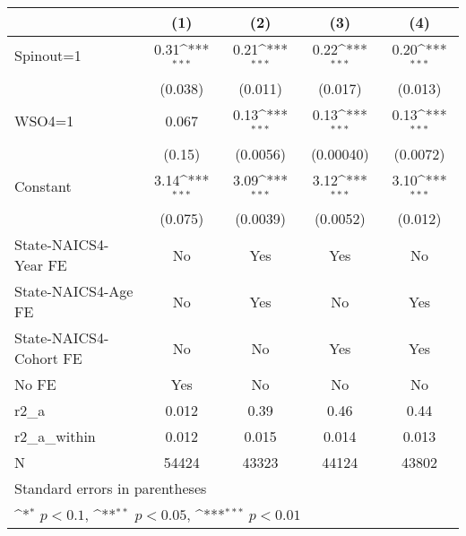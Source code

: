 {
\def\sym#1{\ifmmode^{#1}\else\(^{#1}\)\fi}
\begin{tabular}{l*{4}{c}}
\hline\hline
                    &\multicolumn{1}{c}{(1)}         &\multicolumn{1}{c}{(2)}         &\multicolumn{1}{c}{(3)}         &\multicolumn{1}{c}{(4)}         \\
\hline
Spinout=1           &        0.31\sym{***}&        0.21\sym{***}&        0.22\sym{***}&        0.20\sym{***}\\
                    &     (0.038)         &     (0.011)         &     (0.017)         &     (0.013)         \\
[1em]
WSO4=1              &       0.067         &        0.13\sym{***}&        0.13\sym{***}&        0.13\sym{***}\\
                    &      (0.15)         &    (0.0056)         &   (0.00040)         &    (0.0072)         \\
[1em]
Constant            &        3.14\sym{***}&        3.09\sym{***}&        3.12\sym{***}&        3.10\sym{***}\\
                    &     (0.075)         &    (0.0039)         &    (0.0052)         &     (0.012)         \\
[1em]
State-NAICS4-Year FE&          No         &         Yes         &         Yes         &          No         \\
[1em]
State-NAICS4-Age FE &          No         &         Yes         &          No         &         Yes         \\
[1em]
State-NAICS4-Cohort FE&          No         &          No         &         Yes         &         Yes         \\
[1em]
No FE               &         Yes         &          No         &          No         &          No         \\
\hline
r2\_a                &       0.012         &        0.39         &        0.46         &        0.44         \\
r2\_a\_within         &       0.012         &       0.015         &       0.014         &       0.013         \\
N                   &       54424         &       43323         &       44124         &       43802         \\
\hline\hline
\multicolumn{5}{l}{\footnotesize Standard errors in parentheses}\\
\multicolumn{5}{l}{\footnotesize \sym{*} \(p<0.1\), \sym{**} \(p<0.05\), \sym{***} \(p<0.01\)}\\
\end{tabular}
}
